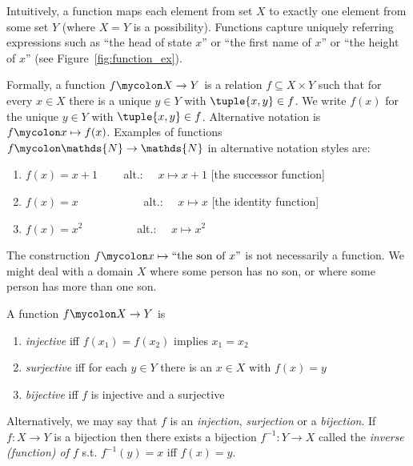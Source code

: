\documentclass[nobib,nofonts]{tufte-handout}
\newcommand{\mygray}[1]{\textcolor{mygray2}{#1}}
\begin{document}
Intuitively, a function maps each element from set $X$ to exactly one element from some set $Y$
(where $X = Y$ is a possibility). Functions capture uniquely referring expressions
such as ``the head of state $x$'' or ``the first name of $x$'' or ``the height of $x$'' (see
Figure~\ref{fig:function_ex}).

Formally, a function $f \mycolon X \rightarrow Y$ is a relation
$f \subseteq X \times Y$ such that for every $x \in X$ there is a unique $y \in Y$ with
$\tuple{x,y} \in f$. We write $f(x)$ for the unique $y \in Y$ with $\tuple{x,y} \in
f$. Alternative notation is $f \mycolon x \mapsto f(x)$. Examples of functions
$f \mycolon \mathds{N} \rightarrow \mathds{N}$ in alternative
notation styles  are:
\begin{enumerate}
\item[] $f(x) = x +1$ \ \ \ \ alt.: \ \   $x \mapsto x + 1$ \hfill \mygray{[the successor function]}
\item[] $f(x) = x$ \ \  \ \ \ \ \ \ \ \ \ alt.: \ \ $x \mapsto x$ \hfill \mygray{[the identity function]}
\item[] $f(x) = x^2$ \  \ \ \ \ \ \ \ \ alt.: \ \ $x \mapsto x^2$ 
\end{enumerate}
The construction $f \mycolon x \mapsto \text{``the son of $x$''}$ is not necessarily a function. We
might deal with a domain $X$ where some person has no son, or where some person has more than one son.


A function $f \mycolon X \rightarrow Y$ is
\begin{enumerate}
\item[] \emph{injective} iff $f(x_1) = f(x_2)$ implies $x_1 = x_2$
\item[] \emph{surjective} iff for each $y \in Y$ there is an $x \in X$ with $f(x)=y$
\item[] \emph{bijective} iff $f$ is injective and a surjective
\end{enumerate}
Alternatively, we may say that $f$ is an \emph{injection}, \emph{surjection} or a
\emph{bijection}.
If $f: X \rightarrow Y$ is a bijection then there exists a bijection $f^{-1}:Y \rightarrow X$ called the \emph{inverse (function) of $f$}
s.t. $f^{-1}(y) = x$ iff $f(x) = y$.
\end{document}
